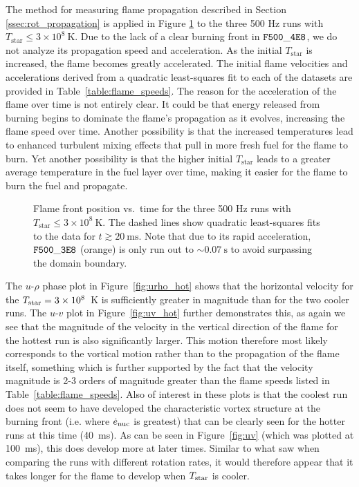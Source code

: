 \documentclass[preprint,times,tighten]{aastex63}
\begin{document}
The method for measuring flame propagation described in Section \ref{ssec:rot_propagation} is applied in Figure \ref{fig:flame_speeds_2} to the three 500 Hz runs with $T_{\mathrm{star}} \leq 3 \times 10^8~\mathrm{K}$. Due to the lack of a clear burning front in $\tt{F500\_4E8}$, we do not analyze its propagation speed and acceleration. As the initial $T_{\mathrm{star}}$ is increased, the flame becomes greatly accelerated. The initial flame velocities and accelerations derived from a quadratic least-squares fit to each of the datasets are provided in Table~\ref{table:flame_speeds}. The reason for the acceleration of the flame over time is not entirely clear. It could be that energy released from burning begins to dominate the flame's propagation as it evolves, increasing the flame speed over time. Another possibility is that the increased temperatures lead to enhanced turbulent mixing effects that pull in more fresh fuel for the flame to burn. Yet another possibility is that the higher initial $T_{\mathrm{star}}$ leads to a greater average temperature in the fuel layer over time, making it easier for the flame to burn the fuel and propagate.


\begin{figure}[t]
	\centering
	\caption{\label{fig:flame_speeds_2} Flame front position vs.\ time for the three 500 Hz runs with
		$T_{\mathrm{star}} \leq 3 \times 10^8~\mathrm{K}$. The dashed lines show quadratic least-squares fits to the data
		for $t \gtrsim 20~\mathrm{ms}$. Note that due to its rapid acceleration, $\tt{F500\_3E8}$ 
		(orange) is only run out to $\sim 0.07~\mathrm{s}$ to avoid surpassing the domain boundary.}
\end{figure}

The $u$-$\rho$ phase plot in Figure~\ref{fig:urho_hot} shows that the horizontal velocity for the $T_{\rm star} = 3\times10^8$~K is sufficiently greater in magnitude than for the two cooler runs. The $u$-$v$ plot in Figure~\ref{fig:uv_hot} further demonstrates this, as again we see that the magnitude of the velocity in the vertical direction of the flame for the hottest run is also significantly larger. This motion therefore most likely corresponds to the vortical motion rather than to the propagation of the flame itself, something which is further supported by the fact that the velocity magnitude is 2-3 orders of magnitude greater than the flame speeds listed in Table~\ref{table:flame_speeds}. Also of interest in these plots is that the coolest run does not seem to have developed the characteristic vortex structure at the burning front (i.e. where $\dot{e}_{\rm nuc}$ is greatest) that can be clearly seen for the hotter runs at this time (40~ms). As can be seen in Figure~\ref{fig:uv} (which was plotted at 100~ms), this does develop more at later times. Similar to what saw when comparing the runs with different rotation rates, it would therefore appear that it takes longer for the flame to develop when $T_{\rm star}$ is cooler. 
\end{document}
